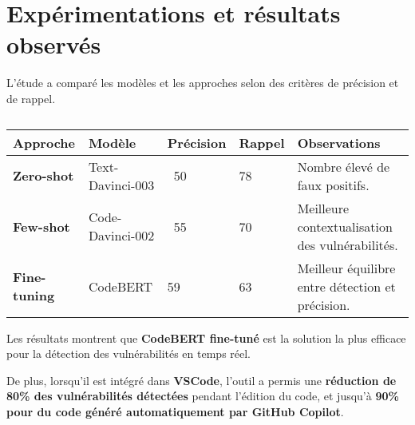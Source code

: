 \label{ExpRO}\chapter{Expérimentations et résultats observés}

L’étude a comparé les modèles et les
approches selon des critères de précision et de rappel.

\begin{table}
        \centering
        \begin{tabular}{lllll}
            \toprule
            \textbf{Approche} & \textbf{Modèle} & \textbf{Précision} & \textbf{Rappel} & \textbf{Observations} \\
            \midrule

  \textbf{Zero-shot}


   &
  Text-Davinci-003


   &
  ~50%


   &
  78%


   &
  Nombre élevé de faux positifs.


   \\

  \textbf{Few-shot}


   &
  Code-Davinci-002


   &
  ~55%


   &
  70%


   &
  Meilleure contextualisation des
  vulnérabilités.


   \\

  \textbf{Fine-tuning}


   &
  CodeBERT


   &
  59%


   &
  63%


   &
  Meilleur équilibre entre détection et
  précision.


   \\
            \bottomrule
        \end{tabular}
        \caption{}
        \label{tab:}
    \end{table}


Les résultats montrent que \textbf{CodeBERT
fine-tuné} est la solution la plus efficace pour la détection des
vulnérabilités en temps réel.



De plus, lorsqu’il est intégré dans \textbf{VSCode},
l’outil a permis une \textbf{réduction de 80\% des vulnérabilités détectées}
pendant l’édition du code, et jusqu’à \textbf{90\% pour du code généré
automatiquement par GitHub Copilot}.




